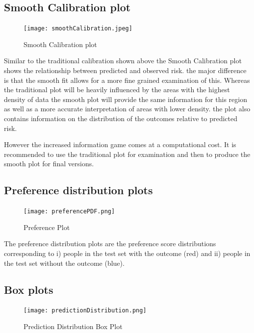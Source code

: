 \documentclass[]{article}
\begin{document}
\subsection{Smooth Calibration plot}\label{smooth-calibration-plot}

\begin{figure}
\centering
\texttt{[image: smoothCalibration.jpeg]}
\caption{Smooth Calibration plot}
\end{figure}

Similar to the traditional calibration shown above the Smooth
Calibration plot shows the relationship between predicted and observed
risk. the major difference is that the smooth fit allows for a more fine
grained examination of this. Whereas the traditional plot will be
heavily influenced by the areas with the highest density of data the
smooth plot will provide the same information for this region as well as
a more accurate interpretation of areas with lower density. the plot
also contains information on the distribution of the outcomes relative
to predicted risk.

However the increased information game comes at a computational cost. It
is recommended to use the traditional plot for examination and then to
produce the smooth plot for final versions.

\newpage

\subsection{Preference distribution
plots}\label{preference-distribution-plots}

\begin{figure}
\centering
\texttt{[image: preferencePDF.png]}
\caption{Preference Plot}
\end{figure}

The preference distribution plots are the preference score distributions
corresponding to i) people in the test set with the outcome (red) and
ii) people in the test set without the outcome (blue).

\newpage

\subsection{Box plots}\label{box-plots}

\begin{figure}
\centering
\texttt{[image: predictionDistribution.png]}
\caption{Prediction Distribution Box Plot}
\end{figure}
\end{document}

